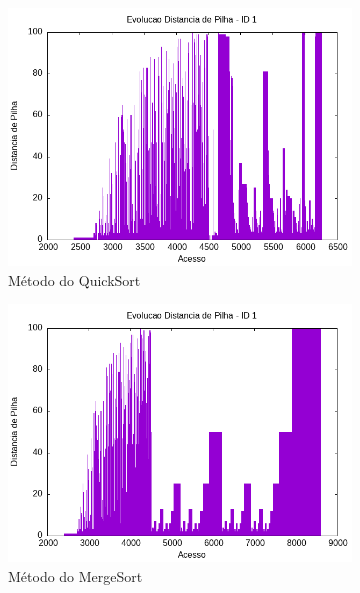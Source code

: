 \documentclass{article}
\begin{document}
\begin{figure}[H]
    \hfill
    \begin{subfigure}[c]{0.4\textwidth}
        \centering
        \includegraphics[width=\textwidth]{./images/100-200/quickSort/registro_a-distp-1.png}
        \caption{Método do QuickSort}   
        \label{fig:ac09}
    \end{subfigure}
    \hfill
    \begin{subfigure}[c]{0.4\textwidth}
        \centering
        \includegraphics[width=\textwidth]{./images/100-200/mergesort/registro_a-distp-1.png}
        \caption{Método do MergeSort}
        \label{fig:ac10}
    \end{subfigure}
    \hfill
    \begin{subfigure}[c]{0.4\textwidth}

\end{subfigure}
\end{figure}
\end{document}
